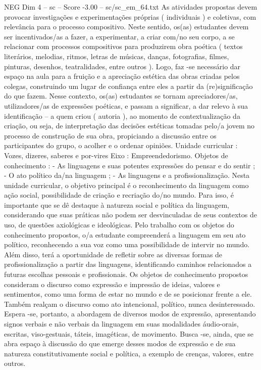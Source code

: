 \begin{textsample}{NEG Dim 4 – sc – Score -3.00 – sc/sc\_em\_64.txt}
As atividades propostas devem provocar investigações e experimentações próprias ( individuais ) e coletivas, com relevância para o processo compositivo.
Neste sentido, os(as) estudantes devem ser incentivados/as a fazer, a experimentar, a criar com/no seu corpo, a se relacionar com processos compositivos para produzirem obra poética ( textos literários, melodias, ritmos, letras de músicas, danças, fotografias, filmes, pinturas, desenhos, teatralidades, entre outros ).
Logo, faz -se necessário dar espaço na aula para a fruição e a apreciação estética das obras criadas pelos colegas, construindo um lugar de confiança entre eles a partir da (re)significação do que fazem.
Nesse contexto, os(as) estudantes se tornam apreciadores/as, utilizadores/as de expressões poéticas, e passam a significar, a dar relevo à sua identificação – a quem criou ( autoria ), ao momento de contextualização da criação, ou seja, de interpretação das decisões estéticas tomadas pelo/a jovem no processo de construção de sua obra, propiciando a discussão entre os participantes do grupo, o acolher e o ordenar opiniões.
Unidade curricular : Vozes, dizeres, saberes e por-vires Eixo : Empreendedorismo.
Objetos de conhecimento : - As linguagens e suas potentes expressões do pensar e do sentir ; - O ato político da/na linguagem ; - As linguagens e a profissionalização.
Nesta unidade curricular, o objetivo principal é o reconhecimento da linguagem como ação social, possibilidade de criação e recriação do/no mundo.
Para isso, é importante que se dê destaque à natureza social e política da linguagem, considerando que suas práticas não podem ser desvinculadas de seus contextos de uso, de questões axiológicas e ideológicas.
Pelo trabalho com os objetos do conhecimento propostos, o/a estudante compreenderá a linguagem em seu ato político, reconhecendo a sua voz como uma possibilidade de intervir no mundo.
Além disso, terá a oportunidade de refletir sobre as diversas formas de profissionalização a partir das linguagens, identificando caminhos relacionados a futuras escolhas pessoais e profissionais.
Os objetos de conhecimento propostos consideram o discurso como expressão e impressão de ideias, valores e sentimentos, como uma forma de estar no mundo e de se posicionar frente a ele.
Também realçam o discurso como ato intencional, político, nunca desinteressado.
Espera -se, portanto, a abordagem de diversos modos de expressão, apresentando signos verbais e não verbais da linguagem em suas modalidades áudio-orais, escritas, viso-gestuais, táteis, imagéticas, de movimento.
Busca -se, ainda, que se abra espaço à discussão do que emerge desses modos de expressão e de sua natureza constitutivamente social e política, a exemplo de crenças, valores, entre outros.

\end{textsample}
